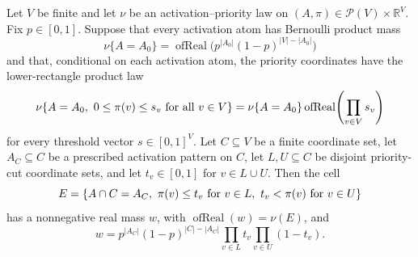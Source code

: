 \begin{helper}
Let \(V\) be finite and let \(\nu\) be an activation--priority law on
\((A,\pi)\in\mathcal P(V)\times \mathbb R^V\).  Fix \(p\in[0,1]\).  Suppose
that every activation atom has Bernoulli product mass
\[
\nu\{A=A_0\}=\operatorname{ofReal}\bigl(p^{|A_0|}(1-p)^{|V|-|A_0|}\bigr)
\]
and that, conditional on each activation atom, the priority coordinates have
the lower-rectangle product law
\[
\nu\{A=A_0,\ 0\le \pi(v)\le s_v\hbox{ for all }v\in V\}
=\nu\{A=A_0\}\operatorname{ofReal}\!\left(\prod_{v\in V}s_v\right)
\]
for every threshold vector \(s\in[0,1]^V\).  Let \(C\subseteq V\) be a finite
coordinate set, let \(A_C\subseteq C\) be a prescribed activation pattern on
\(C\), let \(L,U\subseteq C\) be disjoint priority-cut coordinate sets, and
let \(t_v\in[0,1]\) for \(v\in L\cup U\).  Then the cell
\[
E=\{A\cap C=A_C,\ \pi(v)\le t_v\hbox{ for }v\in L,\ 
       t_v<\pi(v)\hbox{ for }v\in U\}
\]
has a nonnegative real mass \(w\), with \(\operatorname{ofReal}(w)=\nu(E)\),
and
\[
w=p^{|A_C|}(1-p)^{|C|-|A_C|}
  \prod_{v\in L}t_v\prod_{v\in U}(1-t_v).
\]
\end{helper}
